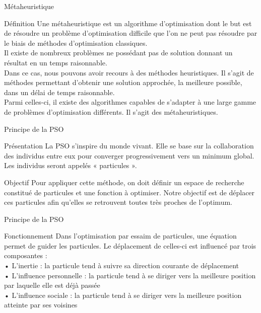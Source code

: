 \documentclass{beamer}
\begin{document}
  \begin{frame}{Métaheuristique}
    \begin{block}{\Large Définition}
      Une métaheuristique est un algorithme d’optimisation dont le but est de résoudre un problème d’optimisation difficile que l’on ne peut pas résoudre par le biais de méthodes d’optimisation classiques. \\
      Il existe de nombreux problèmes ne possédant pas de solution donnant un résultat en un temps raisonnable. \\
      Dans ce cas, nous pouvons avoir recours à des méthodes heuristiques. Il s’agit de méthodes permettant d’obtenir une solution approchée, la meilleure possible, dans un délai de temps raisonnable. \\
      Parmi celles-ci, il existe des algorithmes capables de s’adapter à une large gamme de problèmes d’optimisation différents. Il s’agit des métaheuristiques.
    \end{block}
  \end{frame}

  \begin{frame}{Principe de la PSO}
    \begin{block}{\Large Présentation}
      \large La PSO s’inspire du monde vivant. Elle se base sur la collaboration des individus entre eux pour converger progressivement vers un minimum global. Les individus seront appelés « particules ».  
    \end{block}\pause
    \begin{block}{\Large Objectif}
      \large Pour appliquer cette méthode, on doit définir un espace de recherche constitué de particules et une fonction à optimiser. Notre objectif est de déplacer ces particules afin qu’elles se retrouvent toutes très proches de l’optimum.
    \end{block}
  \end{frame}

  \begin{frame}{Principe de la PSO}
    \begin{block}{\Large Fonctionnement}
      \large Dans l’optimisation par essaim de particules, une équation permet de guider les particules. Le déplacement de celles-ci est influencé par trois composantes : 
 \\
•	L’inertie : la particule tend à suivre sa direction courante de déplacement 
\\
•	L’influence personnelle : la particule tend à se diriger vers la meilleure position par laquelle elle est déjà passée
\\
•	L’influence sociale : la particule tend à se diriger vers la meilleure position atteinte par ses voisines
    \end{block}
  \end{frame}
\end{document}
